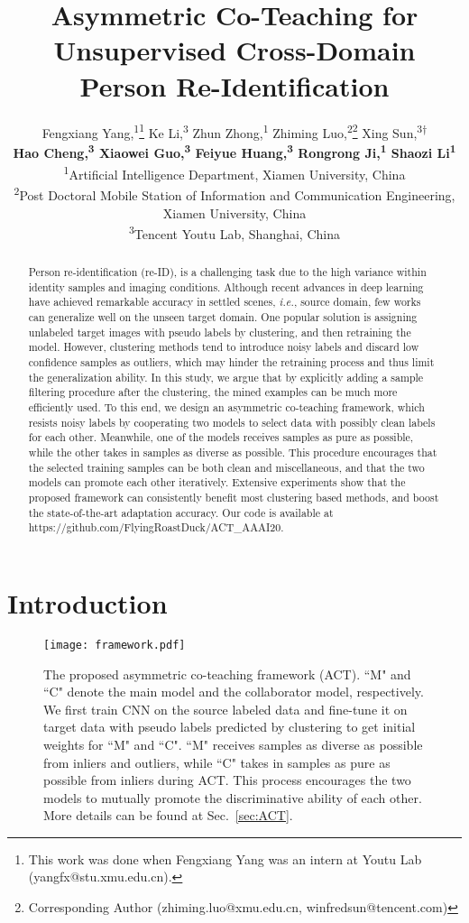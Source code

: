 \documentclass[letterpaper]{article} \usepackage{aaai20}  \usepackage{times}  \usepackage{helvet} \usepackage{courier}  \usepackage[hyphens]{url}  \usepackage{graphicx} \urlstyle{rm} \def\UrlFont{\rm}  \usepackage{graphicx}  \frenchspacing  \setlength{\pdfpagewidth}{8.5in}  \setlength{\pdfpageheight}{11in}  \usepackage{color}
\title{Asymmetric Co-Teaching for Unsupervised Cross-Domain \\ Person Re-Identification}
\author{
Fengxiang Yang,\textsuperscript{\rm 1}\thanks{This work was done when Fengxiang Yang was an intern at Youtu Lab (yangfx@stu.xmu.edu.cn).}
Ke Li,\textsuperscript{\rm 3}
Zhun Zhong,\textsuperscript{\rm 1}
Zhiming Luo,\textsuperscript{\rm 2}\thanks{Corresponding Author (zhiming.luo@xmu.edu.cn, winfredsun@tencent.com)}
Xing Sun,\textsuperscript{\rm 3}\textsuperscript{$\dag$}\\
\Large \textbf{Hao Cheng,\textsuperscript{\rm 3}
Xiaowei Guo,\textsuperscript{\rm 3}
Feiyue Huang,\textsuperscript{\rm 3}
Rongrong Ji,\textsuperscript{\rm 1}
Shaozi Li\textsuperscript{\rm 1}}\\
\textsuperscript{\rm 1}Artificial Intelligence Department, Xiamen University, China\\
\textsuperscript{\rm 2}Post Doctoral Mobile Station of Information and Communication Engineering, Xiamen University, China\\
\textsuperscript{\rm 3}Tencent Youtu Lab, Shanghai, China
}
\begin{document}
\maketitle

\begin{abstract}

Person re-identification (re-ID), is a challenging task due to the high variance within identity samples and imaging conditions. Although recent advances in deep learning have achieved remarkable accuracy in settled scenes, \textit{i.e.}, source domain, few works can generalize well on the unseen target domain. One popular solution is assigning unlabeled target images with pseudo labels by clustering, and then retraining the model. However, clustering methods tend to introduce noisy labels and discard low confidence samples as outliers, which may hinder the retraining process and thus limit the generalization ability. In this study, we argue that by explicitly adding a sample filtering procedure after the clustering, the mined examples can be much more efficiently used. To this end, we design an asymmetric co-teaching framework, which resists noisy labels by cooperating two models to select data with possibly clean labels for each other. Meanwhile, one of the models receives samples as pure as possible, while the other takes in samples as diverse as possible. This procedure encourages that the selected training samples can be both clean and miscellaneous, and that the two models can promote each other iteratively. Extensive experiments show that the proposed framework can consistently benefit most clustering based methods, and boost the state-of-the-art adaptation accuracy. Our code is available at https://github.com/FlyingRoastDuck/ACT\_AAAI20.

\end{abstract}


\section{Introduction}
\label{sec:da}


\begin{figure*}[!t]
  \texttt{[image: framework.pdf]}
  \label{fig:process}
  \caption{The proposed asymmetric co-teaching framework (ACT). ``M" and ``C" denote the main model and the collaborator model, respectively. We first train CNN on the source labeled data and fine-tune it on target data with pseudo labels predicted by clustering to get initial weights for ``M" and ``C". ``M" receives samples as diverse as possible from inliers and outliers, while ``C" takes in samples as pure as possible from inliers during ACT. This process encourages the two models to mutually promote the discriminative ability of each other. More details can be found at Sec.~\ref{sec:ACT}.}
\end{figure*}
\end{document}
